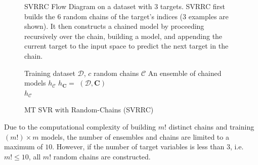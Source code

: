 \documentclass[reqno]{vcuthesis}
\numberwithin{equation}{chapter}
\begin{document}
\begin{figure}[t]
\centering \small
\begin{minipage}{\textwidth}
\centering \small
{}
\end{minipage}
\caption{SVRRC Flow Diagram on a dataset with 3 targets. SVRRC first builds the $6$ random chains of the target's indices ($3$ examples are shown). It then constructs a chained model by proceeding recursively over the chain, building a model, and appending the current target to the input space to predict the next target in the chain. } \label{fig:svrrc}
\begin{algorithm}[H]
\caption{MT SVR with Random-Chains (SVRRC)}
\small \centering
\label{alg:SVRRC} 
\begin{algorithmic}[1]
\renewcommand{\algorithmicrequire}{\textbf{Input:}}
\renewcommand{\algorithmicensure}{\textbf{Output:}}
\Require Training dataset $\mathcal{D}$, $c$ random chains $\mathcal{C}$
\Ensure  An ensemble of chained models $h_\mathcal{C}$
 
\State $h_{\bm C} = $ $(\mathcal{D},\bm C)$ 
\EndFor \\
\Return $h_\mathcal{C}$ 
\end{algorithmic} 
\end{algorithm}
\end{figure}

Due to the computational complexity of building $m!$ distinct chains and training $\left(m!\right) \times m$ models, the number of ensembles and chains are limited to a maximum of $10$. However, if the number of target variables is less than $3$, i.e. $m! \leq 10$, all $m!$ random chains are constructed. 
\end{document}
